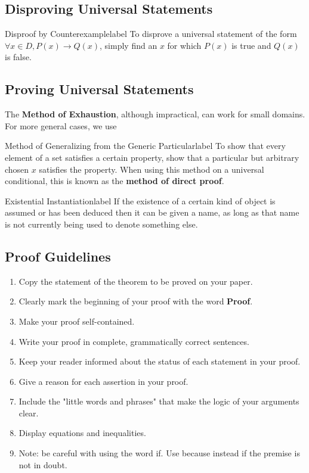\documentclass[a4paper]{report}
\begin{document}
\subsection{Disproving Universal Statements}

\begin{definition}{Disproof by Counterexample}{label}
    To disprove a universal statement of the form $\forall x \in D, P(x) \to Q(x)$, simply find an
    $x$ for which $P(x)$ is true and $Q(x)$ is false.
\end{definition}

\subsection{Proving Universal Statements}

The \textbf{Method of Exhaustion}, although impractical, can work for small domains. For more general
cases, we use

\begin{definition}{Method of Generalizing from the Generic Particular}{label}
    To show that every element of a set satisfies a certain property, show that a particular but
    arbitrary chosen $x$ satisfies the property. When using this method on a universal conditional,
    this is known as the \textbf{method of direct proof}.
\end{definition}

\begin{definition}{Existential Instantiation}{label}
    If the existence of a certain kind of object is assumed or has been deduced then it can be
    given a name, as long as that name is not currently being used to denote something else.
\end{definition}

\subsection{Proof Guidelines}

\begin{enumerate}
    \item Copy the statement of the theorem to be proved on your paper.
    \item Clearly mark the beginning of your proof with the word \textbf{Proof}.
    \item Make your proof self-contained.
    \item Write your proof in complete, grammatically correct sentences.
    \item Keep your reader informed about the status of each statement in your proof.
    \item Give a reason for each assertion in your proof.
    \item Include the "little words and phrases" that make the logic of your arguments clear.
    \item Display equations and inequalities.
    \item Note: be careful with using the word if. Use because instead if the premise is not in doubt.
\end{enumerate}
\end{document}
